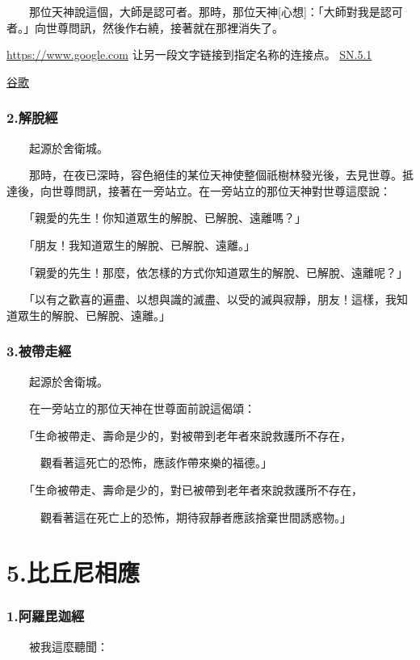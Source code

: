 \documentclass[12pt,oneside]{book}
\begin{document}
　　那位天神說這個，大師是認可者。那時，那位天神[心想]：「大師對我是認可者。」向世尊問訊，然後作右繞，接著就在那裡消失了。

\hyperlink{sn 1.1}{https://www.google.com} 让另一段文字链接到指定名称的连接点。
\hyperref[subsec:SN.5.1]{SN.5.1}

\href{https://www.google.com}{\underline{谷歌}}

\subsection{2.解脫經}
　　起源於舍衛城。

　　那時，在夜已深時，容色絕佳的某位天神使整個祇樹林發光後，去見世尊。抵達後，向世尊問訊，接著在一旁站立。在一旁站立的那位天神對世尊這麼說：

　　「親愛的先生！你知道眾生的解脫、已解脫、遠離嗎？」

　　「朋友！我知道眾生的解脫、已解脫、遠離。」

　　「親愛的先生！那麼，依怎樣的方式你知道眾生的解脫、已解脫、遠離呢？」

　　「以有之歡喜的遍盡、以想與識的滅盡、以受的滅與寂靜，朋友！這樣，我知道眾生的解脫、已解脫、遠離。」

\subsection{3.被帶走經}

　　起源於舍衛城。

　　在一旁站立的那位天神在世尊面前說這偈頌：

　　「生命被帶走、壽命是少的，對被帶到老年者來說救護所不存在，

　　　觀看著這死亡的恐怖，應該作帶來樂的福德。」

　　「生命被帶走、壽命是少的，對已被帶到老年者來說救護所不存在，

　　　觀看著這在死亡上的恐怖，期待寂靜者應該捨棄世間誘惑物。」

\chapter{5.比丘尼相應}

\subsection{1.阿羅毘迦經}\label{subsec:SN.5.1}

　　被我這麼聽聞：
\end{document}
